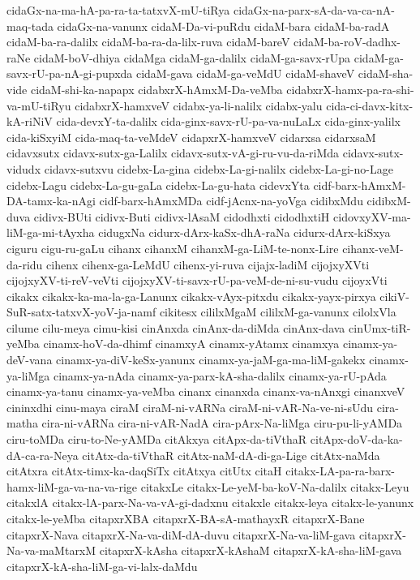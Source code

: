 {cidaGx-na-ma-hA-pa-ra-ta-tatxvX-mU-tiRya
cidaGx-na-parx-sA-da-va-ca-nA-maq-tada
cidaGx-na-vanunx
cidaM-Da-vi-puRdu
cidaM-bara
cidaM-ba-radA
cidaM-ba-ra-dalilx
cidaM-ba-ra-da-lilx-ruva
cidaM-bareV
cidaM-ba-roV-dadhx-raNe
cidaM-boV-dhiya
cidaMga
cidaM-ga-dalilx
cidaM-ga-savx-rUpa
cidaM-ga-savx-rU-pa-nA-gi-pupxda
cidaM-gava
cidaM-ga-veMdU
cidaM-shaveV
cidaM-sha-vide
cidaM-shi-ka-napapx
cidabxrX-hAmxM-Da-veMba
cidabxrX-hamx-pa-ra-shi-va-mU-tiRyu
cidabxrX-hamxveV
cidabx-ya-li-nalilx
cidabx-yalu
cida-ci-davx-kitx-kA-riNiV
cida-devxY-ta-dalilx
cida-ginx-savx-rU-pa-va-nuLaLx
cida-ginx-yalilx
cida-kiSxyiM
cida-maq-ta-veMdeV
cidapxrX-hamxveV
cidarxsa
cidarxsaM
cidavxsutx
cidavx-sutx-ga-Lalilx
cidavx-sutx-vA-gi-ru-vu-da-riMda
cidavx-sutx-vidudx
cidavx-sutxvu
cidebx-La-gina
cidebx-La-gi-nalilx
cidebx-La-gi-no-Lage
cidebx-Lagu
cidebx-La-gu-gaLa
cidebx-La-gu-hata
cidevxYta
cidf-barx-hAmxM-DA-tamx-ka-nAgi
cidf-barx-hAmxMDa
cidf-jAcnx-na-yoVga
cidibxMdu
cidibxM-duva
cidivx-BUti
cidivx-Buti
cidivx-lAsaM
cidodhxti
cidodhxtiH
cidovxyXV-ma-liM-ga-mi-tAyxha
cidugxNa
cidurx-dArx-kaSx-dhA-raNa
cidurx-dArx-kiSxya
ciguru
cigu-ru-gaLu
cihanx
cihanxM
cihanxM-ga-LiM-te-nonx-Lire
cihanx-veM-da-ridu
cihenx
cihenx-ga-LeMdU
cihenx-yi-ruva
cijajx-ladiM
cijojxyXVti
cijojxyXV-ti-reV-veVti
cijojxyXV-ti-savx-rU-pa-veM-de-ni-su-vudu
cijoyxVti
cikakx
cikakx-ka-ma-la-ga-Lanunx
cikakx-vAyx-pitxdu
cikakx-yayx-pirxya
cikiV-SuR-satx-tatxvX-yoV-ja-namf
cikitesx
cililxMgaM
cililxM-ga-vanunx
cilolxVla
cilume
cilu-meya
cimu-kisi
cinAnxda
cinAnx-da-diMda
cinAnx-dava
cinUmx-tiR-yeMba
cinamx-hoV-da-dhimf
cinamxyA
cinamx-yAtamx
cinamxya
cinamx-ya-deV-vana
cinamx-ya-diV-keSx-yanunx
cinamx-ya-jaM-ga-ma-liM-gakekx
cinamx-ya-liMga
cinamx-ya-nAda
cinamx-ya-parx-kA-sha-dalilx
cinamx-ya-rU-pAda
cinamx-ya-tanu
cinamx-ya-veMba
cinanx
cinanxda
cinanx-va-nAnxgi
cinanxveV
cininxdhi
cinu-maya
ciraM
ciraM-ni-vARNa
ciraM-ni-vAR-Na-ve-ni-sUdu
cira-matha
cira-ni-vARNa
cira-ni-vAR-NadA
cira-pArx-Na-liMga
ciru-pu-li-yAMDa
ciru-toMDa
ciru-to-Ne-yAMDa
citAkxya
citApx-da-tiVthaR
citApx-doV-da-ka-dA-ca-ra-Neya
citAtx-da-tiVthaR
citAtx-naM-dA-di-ga-Lige
citAtx-naMda
citAtxra
citAtx-timx-ka-daqSiTx
citAtxya
citUtx
citaH
citakx-LA-pa-ra-barx-hamx-liM-ga-va-na-va-rige
citakxLe
citakx-Le-yeM-ba-koV-Na-dalilx
citakx-Leyu
citakxlA
citakx-lA-parx-Na-va-vA-gi-dadxnu
citakxle
citakx-leya
citakx-le-yanunx
citakx-le-yeMba
citapxrXBA
citapxrX-BA-sA-mathayxR
citapxrX-Bane
citapxrX-Nava
citapxrX-Na-va-diM-dA-duvu
citapxrX-Na-va-liM-gava
citapxrX-Na-va-maMtarxM
citapxrX-kAsha
citapxrX-kAshaM
citapxrX-kA-sha-liM-gava
citapxrX-kA-sha-liM-ga-vi-lalx-daMdu
}
